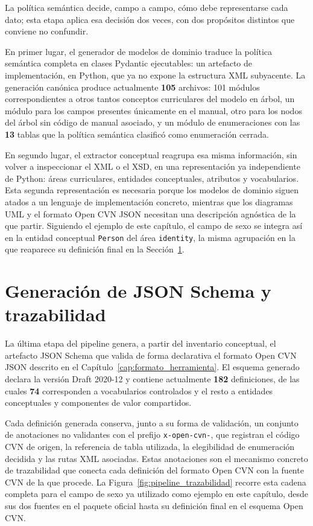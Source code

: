 La política semántica decide, campo a campo, cómo debe representarse cada
dato; esta etapa aplica esa decisión dos veces, con dos propósitos distintos
que conviene no confundir.

En primer lugar, el generador de modelos de dominio traduce la política
semántica completa en clases Pydantic ejecutables: un artefacto de
implementación, en Python, que ya no expone la estructura XML subyacente. La
generación canónica produce actualmente \textbf{105} archivos: 101 módulos
correspondientes a otros tantos conceptos curriculares del modelo en árbol,
un módulo para los campos presentes únicamente en el manual, otro para los
nodos del árbol sin código de manual asociado, y un módulo de enumeraciones
con las \textbf{13} tablas que la política semántica clasificó como
enumeración cerrada.

En segundo lugar, el extractor conceptual reagrupa esa misma información,
sin volver a inspeccionar el XML o el XSD, en una representación ya
independiente de Python: áreas curriculares, entidades conceptuales,
atributos y vocabularios. Esta segunda representación es necesaria porque los
modelos de dominio siguen atados a un lenguaje de implementación concreto,
mientras que los diagramas UML y el formato Open CVN JSON necesitan una
descripción agnóstica de la que partir. Siguiendo el ejemplo de este
capítulo, el campo de sexo se integra así en la entidad conceptual
\texttt{Person} del área \texttt{identity}, la misma agrupación en la que
reaparece su definición final en la Sección~\ref{sec:pipeline_json_schema}.

\section{Generación de JSON Schema y trazabilidad}
\label{sec:pipeline_json_schema}

La última etapa del pipeline genera, a partir del inventario conceptual, el
artefacto JSON Schema que valida de forma declarativa el formato Open CVN
JSON descrito en el Capítulo~\ref{cap:formato_herramienta}. El esquema generado declara la versión Draft
2020-12 y contiene actualmente \textbf{182} definiciones, de las cuales
\textbf{74} corresponden a vocabularios controlados y el resto a entidades
conceptuales y componentes de valor compartidos.

Cada definición generada conserva, junto a su forma de validación, un
conjunto de anotaciones no validantes con el prefijo \texttt{x-open-cvn-},
que registran el código CVN de origen, la referencia de tabla utilizada, la
elegibilidad de enumeración decidida y las rutas XML asociadas. Estas
anotaciones son el mecanismo concreto de trazabilidad que conecta cada
definición del formato Open CVN con la fuente CVN de la que procede. La
Figura~\ref{fig:pipeline_trazabilidad} recorre esta cadena completa para el
campo de sexo ya utilizado como ejemplo en este capítulo, desde sus dos
fuentes en el paquete oficial hasta su definición final en el esquema Open
CVN.

